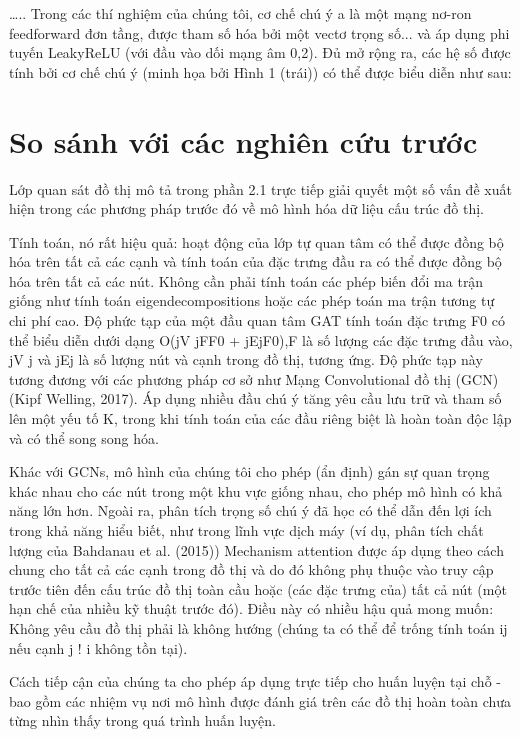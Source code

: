 …..
Trong các thí nghiệm của chúng tôi, cơ chế chú ý a là một mạng nơ-ron feedforward đơn tầng, được tham số hóa bởi một vectơ trọng số... và áp dụng phi tuyến LeakyReLU (với đầu vào dối mạng âm  0,2). Đủ mở rộng ra, các hệ số được tính bởi cơ chế chú ý (minh họa bởi Hình 1 (trái)) có thể được biểu diễn như sau:



\section{So sánh với các nghiên cứu trước}
Lớp quan sát đồ thị mô tả trong phần 2.1 trực tiếp giải quyết một số vấn đề xuất hiện trong các phương pháp trước đó về mô hình hóa dữ liệu cấu trúc đồ thị.

Tính toán, nó rất hiệu quả: hoạt động của lớp tự quan tâm có thể được đồng bộ hóa trên tất cả các cạnh và tính toán của đặc trưng đầu ra có thể được đồng bộ hóa trên tất cả các nút. Không cần phải tính toán các phép biến đổi ma trận giống như tính toán eigendecompositions hoặc các phép toán ma trận tương tự chi phí cao. Độ phức tạp của một đầu quan tâm GAT tính toán đặc trưng F0 có thể biểu diễn dưới dạng O(jV jFF0 + jEjF0),F là số lượng các đặc trưng đầu vào, jV j và jEj là số lượng nút và cạnh trong đồ thị, tương ứng. Độ phức tạp này tương đương với các phương pháp cơ sở như Mạng Convolutional đồ thị (GCN) (Kipf  Welling, 2017). Áp dụng nhiều đầu chú ý tăng yêu cầu lưu trữ và tham số lên một yếu tố K, trong khi tính toán của các đầu riêng biệt là hoàn toàn độc lập và có thể song song hóa.

Khác với GCNs, mô hình của chúng tôi cho phép (ẩn định) gán sự quan trọng khác nhau cho các nút trong một khu vực giống nhau, cho phép mô hình có khả năng lớn hơn. Ngoài ra, phân tích trọng số chú ý đã học có thể dẫn đến lợi ích trong khả năng hiểu biết, như trong lĩnh vực dịch máy (ví dụ, phân tích chất lượng của Bahdanau et al. (2015))
Mechanism attention được áp dụng theo cách chung cho tất cả các cạnh trong đồ thị và do đó không phụ thuộc vào truy cập trước tiên đến cấu trúc đồ thị toàn cầu hoặc (các đặc trưng của) tất cả nút (một hạn chế của nhiều kỹ thuật trước đó). Điều này có nhiều hậu quả mong muốn:
Không yêu cầu đồ thị phải là không hướng (chúng ta có thể để trống tính toán ij nếu cạnh j ! i không tồn tại).

Cách tiếp cận của chúng ta cho phép áp dụng trực tiếp cho huấn luyện tại chỗ - bao gồm các nhiệm vụ nơi mô hình được đánh giá trên các đồ thị hoàn toàn chưa từng nhìn thấy trong quá trình huấn luyện.

